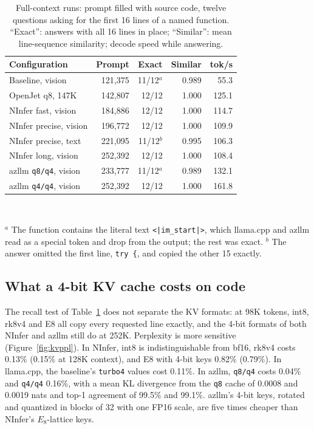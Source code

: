 \begin{table}[t]
  \centering
  \caption{Full-context runs: prompt filled with source code, twelve questions asking for the
           first 16 lines of a named function. ``Exact'': answers with all 16 lines in place;
           ``Similar'': mean line-sequence similarity; decode speed while answering.}
  \label{tab:fill}
  \small
  \setlength{\tabcolsep}{3pt}
  \begin{tabular}{@{}lrrrr@{}}
    \toprule
    Configuration & Prompt & Exact & Similar & tok/s \\
    \midrule
    Baseline, vision & 121{,}375 & 11/12$^a$ & 0.989 & 55.3 \\
    OpenJet q8, 147K & 142{,}807 & 12/12 & 1.000 & 125.1 \\
    NInfer fast, vision & 184{,}886 & 12/12 & 1.000 & 114.7 \\
    NInfer precise, vision & 196{,}772 & 12/12 & 1.000 & 109.9 \\
    NInfer precise, text & 221{,}095 & 11/12$^b$ & 0.995 & 106.3 \\
    NInfer long, vision & 252{,}392 & 12/12 & 1.000 & 108.4 \\
    azllm \texttt{q8/q4}, vision & 233{,}777 & 11/12$^a$ & 0.989 & 132.1 \\
    azllm \texttt{q4/q4}, vision & 252{,}392 & 12/12 & 1.000 & 161.8 \\
    \bottomrule
  \end{tabular}\\[2pt]
  \parbox{\columnwidth}{\scriptsize $^a$ The function contains the literal text
  \texttt{<|im\_start|>}, which llama.cpp and azllm read as a special token and drop from the
  output; the rest was exact. $^b$ The answer omitted the first line, \texttt{try \{}, and copied
  the other 15 exactly.}
\end{table}

\subsection{What a 4-bit KV cache costs on code}

The recall test of Table~\ref{tab:fill} does not separate the KV formats: at 98K tokens, int8,
rk8v4 and E8 all copy every requested line exactly, and the 4-bit formats of both NInfer and
azllm still do at 252K. Perplexity is more sensitive (Figure~\ref{fig:kvppl}). In NInfer, int8
is indistinguishable from bf16, rk8v4 costs 0.13\% (0.15\% at 128K context), and E8 with 4-bit
keys 0.82\% (0.79\%). In llama.cpp, the baseline's \texttt{turbo4} values cost 0.11\%. In
azllm, \texttt{q8/q4} costs 0.04\% and \texttt{q4/q4} 0.16\%, with a mean KL divergence from the
\texttt{q8} cache of 0.0008 and 0.0019 nats and top-1 agreement of 99.5\% and 99.1\%. azllm's
4-bit keys, rotated and quantized in blocks of 32 with one FP16 scale, are five times cheaper
than NInfer's $E_8$-lattice keys.

